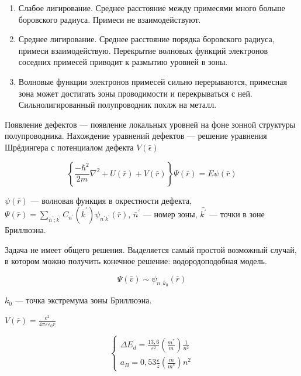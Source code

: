 \begin{enumerate}
    \item Слабое лигирование. Среднее расстояние между примесями много больше боровского радиуса. Примеси не взаимодействуют.
    \item Среднее лигирование. Среднее расстояние порядка боровского радиуса, примеси взаимодействую. Перекрытие волновых функций электронов соседних примесей приводит к размытию уровней в зоны.
    \item Волновые функции электронов примесей сильно перерываются, примесная зона может достигать зоны проводимости и перекрываться с ней. Сильнолигированный полупроводник похлж на металл.
\end{enumerate}

Появление дефектов --- появление локальных уровней на фоне зонной структуры полупроводника. Нахождение уравнений дефектов --- решение уравнения Шрёдингера с потенциалом дефекта $V(\bar{\epsilon})$

$$
\left\{\frac{-\hbar^2}{2 m} \nabla^2+U(\bar{r})+V(\bar{r})\right\} \Psi(\bar{r})=E \psi(\bar{r})
$$

$\psi(\bar{r})$ --- волновая функция в окрестности дефекта, $\Psi(\bar{r})=\sum_{\bar{n}^{\prime} ; \bar{k^{\prime}}} C_{n^{\prime}}\left(\bar{k}^{\prime}\right) \psi_{n^{\prime} k^{\prime}}(\bar{r})$, $\bar{n}^{\prime}$ --- номер зоны, $\bar{k^{\prime}}$ --- точки в зоне Бриллюэна.

Задача не имеет общего решения. Выделяется самый простой возможный случай, в котором можно получить конечное решение: водородоподобная модель.

$$\Psi(\bar{v}) \sim \psi_{n, \bar{k}_0}(\bar{r})$$

\noindent $k_0$ --- точка экстремума зоны Бриллюэна.

$V(\bar{r})=\frac{e^2}{4 \pi \varepsilon \varepsilon_0 r}$

$$
\left\{\begin{array}{l}
\Delta E_d=\frac{13,6}{\varepsilon^2}\left(\frac{m^*}{m}\right) \frac{1}{n^2} \\
a_B=0,53 \frac{\varepsilon}{z}\left(\frac{m}{m^*}\right) n^2
\end{array}\right.
$$


